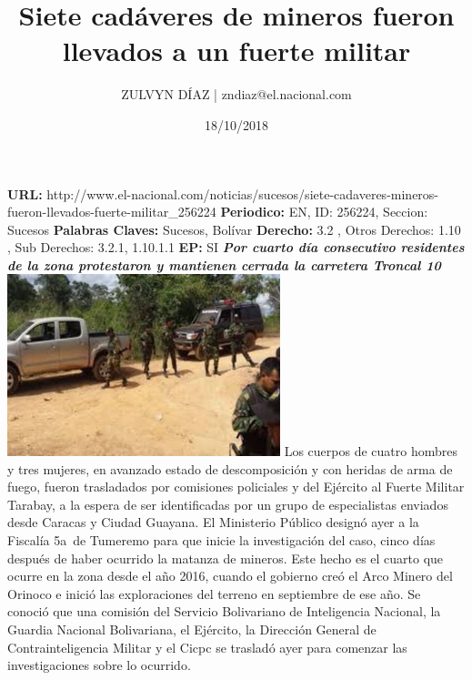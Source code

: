 \documentclass{article}%
\title{\textbf{Siete cadáveres de mineros fueron llevados a un fuerte militar}}%
\author{ZULVYN DÍAZ | zndiaz@el.nacional.com}%
\date{18/10/2018}%
\begin{document}
%
\normalsize%
\maketitle%
\textbf{URL: }%
http://www.el{-}nacional.com/noticias/sucesos/siete{-}cadaveres{-}mineros{-}fueron{-}llevados{-}fuerte{-}militar\_256224\newline%
%
\textbf{Periodico: }%
EN, %
ID: %
256224, %
Seccion: %
Sucesos\newline%
%
\textbf{Palabras Claves: }%
Sucesos, Bolívar\newline%
%
\textbf{Derecho: }%
3.2%
, Otros Derechos: %
1.10%
, Sub Derechos: %
3.2.1, 1.10.1.1%
\newline%
%
\textbf{EP: }%
SI\newline%
\newline%
%
\textbf{\textit{Por cuarto día consecutivo residentes de la zona protestaron y mantienen cerrada la carretera Troncal 10}}%
\newline%
\newline%
%
\includegraphics[width=300px]{243.jpg}%
\newline%
%
Los cuerpos de cuatro hombres y tres mujeres, en avanzado estado de descomposición y con heridas de arma de fuego, fueron trasladados por comisiones policiales y del Ejército al Fuerte Militar Tarabay, a la espera de ser identificadas por un grupo de especialistas enviados desde Caracas y Ciudad Guayana.%
\newline%
%
El Ministerio Público designó ayer a la Fiscalía 5a~de Tumeremo para que inicie la investigación del caso, cinco días después de haber ocurrido la matanza de mineros. Este hecho es el cuarto que ocurre en la zona desde el año 2016, cuando el gobierno creó el Arco Minero del Orinoco e inició las exploraciones del terreno en septiembre de ese año.%
\newline%
%
Se conoció que una comisión del Servicio Bolivariano de Inteligencia Nacional, la Guardia Nacional Bolivariana, el Ejército, la Dirección General de Contrainteligencia Militar y el Cicpc se trasladó ayer para comenzar las investigaciones sobre lo ocurrido.%
\end{document}
